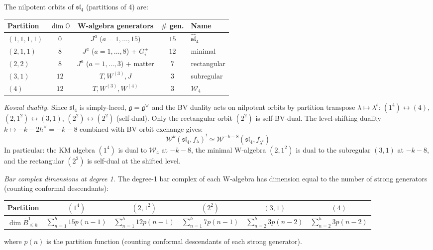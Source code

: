 \begin{computation}
\label{comp:sl4-ds-hierarchy}

The nilpotent orbits of $\mathfrak{sl}_4$ (partitions of 4) are:
\begin{center}
\renewcommand{\arraystretch}{1.2}
\begin{tabular}{lcccl}
\textbf{Partition} & $\dim \mathbb{O}$ &
\textbf{W-algebra generators} & $\#$ gen. & \textbf{Name} \\
\hline
$(1,1,1,1)$ & $0$ & $J^a$ ($a = 1,\ldots,15$) & $15$ &
$\widehat{\mathfrak{sl}}_4$ \\
$(2,1,1)$ & $8$ & $J^a$ ($a=1,\ldots,8$) + $G^\pm_i$ & $12$ &
minimal \\
$(2,2)$ & $8$ & $J^a$ ($a=1,\ldots,3$) + matter & $7$ &
rectangular \\
$(3,1)$ & $12$ & $T, W^{(3)}, J$ & $3$ & subregular \\
$(4)$ & $12$ & $T, W^{(3)}, W^{(4)}$ & $3$ &
$\mathcal{W}_4$
\end{tabular}
\end{center}

\emph{Koszul duality.}
Since $\mathfrak{sl}_4$ is simply-laced, $\mathfrak{g} = \mathfrak{g}^\vee$ and the
BV duality acts on nilpotent orbits by partition transpose
$\lambda \mapsto \lambda^t$:
$(1^4) \leftrightarrow (4)$, $(2,1^2) \leftrightarrow (3,1)$,
$(2^2) \leftrightarrow (2^2)$ (self-dual).
Only the rectangular orbit $(2^2)$ is self-BV-dual.
The level-shifting duality $k \mapsto -k-2h^\vee = -k-8$ combined
with BV orbit exchange gives:
\[
\mathcal{W}^k(\mathfrak{sl}_4, f_\lambda)^!
\simeq \mathcal{W}^{-k-8}(\mathfrak{sl}_4, f_{\lambda^t})
\]
In particular: the KM algebra $(1^4)$ is dual to $\mathcal{W}_4$
at $-k-8$, the minimal W-algebra $(2,1^2)$ is dual to the
subregular $(3,1)$ at $-k-8$, and the rectangular $(2^2)$ is
self-dual at the shifted level.

\emph{Bar complex dimensions at degree 1.}
The degree-1 bar complex of each W-algebra has dimension equal
to the number of strong generators (counting conformal descendants):
\begin{center}
\renewcommand{\arraystretch}{1.2}
{\small
\begin{tabular}{l|ccccc}
Partition & $(1^4)$ & $(2,1^2)$ & $(2^2)$ & $(3,1)$ & $(4)$ \\
\hline
$\dim \bar{B}^1_{\leq h}$ &
$\sum_{n=1}^{h} 15 p(n\!-\!1)$ &
$\sum_{n=1}^{h} 12 p(n\!-\!1)$ &
$\sum_{n=1}^{h} 7 p(n\!-\!1)$ &
$\sum_{n=2}^{h} 3 p(n\!-\!2)$ &
$\sum_{n=2}^{h} 3 p(n\!-\!2)$
\end{tabular}
}
\end{center}
where $p(n)$ is the partition function (counting conformal
descendants of each strong generator).
\end{computation}
